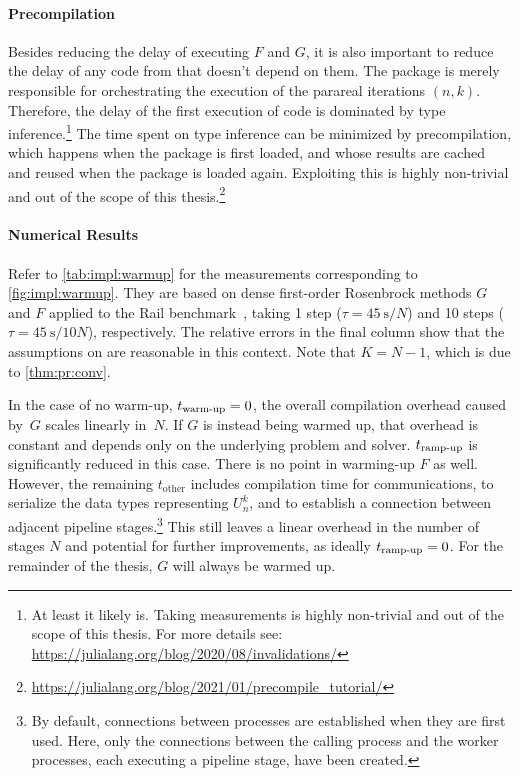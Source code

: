 \paragraph{Precompilation}

Besides reducing the delay of executing $F$ and $G$,
it is also important to reduce the delay of any code from  that doesn't depend on them.
The package is merely responsible for orchestrating the execution of the parareal iterations $(n,k)$.
Therefore, the delay of the first execution of  code is dominated by type inference.\footnote{%
  At least it likely is. Taking measurements is highly non-trivial and out of the scope of this thesis.
  For more details see: \url{https://julialang.org/blog/2020/08/invalidations/}
}
The time spent on type inference can be minimized by precompilation,
which happens when the package is first loaded,
and whose results are cached and reused when the package is loaded again.
Exploiting this is highly non-trivial and out of the scope of this thesis.\footnote{\url{https://julialang.org/blog/2021/01/precompile_tutorial/}}

\paragraph{Numerical Results}

Refer to \autoref{tab:impl:warmup} for the measurements corresponding to \autoref{fig:impl:warmup}.
They are based on dense first-order Rosenbrock methods $G$ and $F$ applied to the Rail benchmark~\cite{morwiki_steel},
taking 1 step ($\tau=\SI{45}{\second}/N$) and 10 steps ($\tau=\SI{45}{\second}/10N$), respectively.
The relative errors in the final column show that the assumptions on  are reasonable in this context.
Note that $K=N-1$, which is due to \autoref{thm:pr:conv}.

In the case of no warm-up, $t_\text{warm-up}=0$, the overall compilation overhead caused by~$G$ scales linearly in~$N$.
If $G$ is instead being warmed up,
that overhead is constant and depends only on the underlying problem and solver.
$t_\text{ramp-up}$ is significantly reduced in this case.
There is no point in warming-up $F$ as well.
However, the remaining $t_\text{other}$ includes compilation time for communications,
\eg to serialize the data types representing $U_n^k$,
and to establish a connection between adjacent pipeline stages.\footnote{%
  By default, connections between processes are established when they are first used.
  Here, only the connections between the calling process and the worker processes,
  each executing a pipeline stage,
  have been created.
}
This still leaves a linear overhead in the number of stages $N$
and potential for further improvements,
as ideally $t_\text{ramp-up}=0$.
For the remainder of the thesis, $G$ will always be warmed up.

